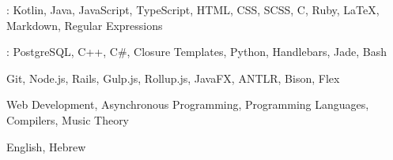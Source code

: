 
\begin{cvparagraph}
    : Kotlin, Java, JavaScript, TypeScript, HTML, CSS, SCSS, C, Ruby, LaTeX, Markdown, Regular Expressions

    : PostgreSQL, C++, C\#, Closure Templates, Python, Handlebars, Jade, Bash

     Git, Node.js, Rails, Gulp.js, Rollup.js, JavaFX, ANTLR, Bison, Flex

     Web Development, Asynchronous Programming, Programming Languages, Compilers, Music Theory

     English, Hebrew
\end{cvparagraph}
